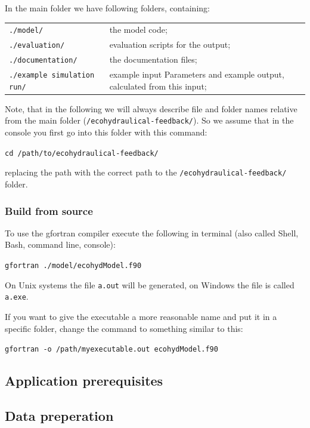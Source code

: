 In the main folder we have following folders, containing:

\begin{tabulary}{\textwidth}{lL}

\texttt{./model/} & the model code;\\
\texttt{./evaluation/} & evaluation scripts for the output;\\
\texttt{./documentation/} & the documentation files;\\
\texttt{./example simulation run/} & example input Parameters and example output, calculated from this input;\\ 

\end{tabulary}

Note, that in the following we will always describe file and folder names relative from the main folder (\texttt{/ecohydraulical-feedback/}). So we assume that in the console you first go into this folder with this command:

\texttt{cd /path/to/ecohydraulical-feedback/}

replacing the path with the correct path to the \texttt{/ecohydraulical-feedback/} folder.

\subsubsection{Build from source \label{sec:build}}

To use the gfortran compiler execute the following in terminal (also called Shell, Bash, command line, console):

\texttt{gfortran ./model/ecohydModel.f90}

On Unix systems the file \texttt{a.out} will be generated, on Windows the file is called \texttt{a.exe}. 

If you want to give the executable a more reasonable name and put it in a specific folder, change the command to something similar to this:

\texttt{gfortran -o /path/myexecutable.out ecohydModel.f90}





\subsection{Application prerequisites}


\subsection{Data preperation}


